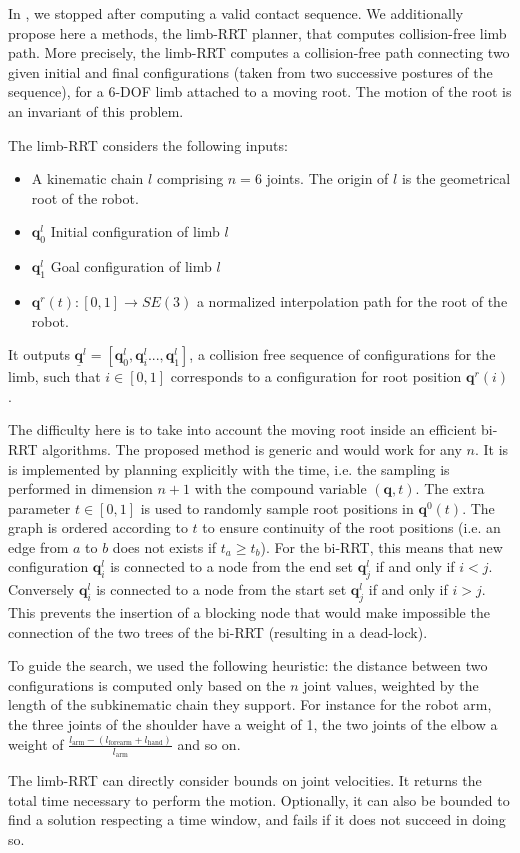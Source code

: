 In \cite{tonneau_isrr15}, we stopped after computing a valid contact sequence. We additionally propose here a methods, the limb-RRT planner, that computes collision-free limb path. More precisely, the limb-RRT computes a collision-free path connecting two given initial and final configurations (taken from two successive postures of the sequence), for a 6-DOF limb attached to a moving root. The motion of the root is an invariant of this problem.

The limb-RRT considers the following inputs:
\begin{itemize}
\item A kinematic chain $l$ comprising $n=6$ joints. The origin of $l$ is the geometrical root of the robot.
\item $\bm{q}^l_{0}$ Initial configuration of limb $l$
\item $\bm{q}^l_{1}$ Goal configuration of limb $l$
\item $\bm{q}^r(t) : [0,1] \longrightarrow SE(3)$ a normalized interpolation path for the root of the robot.
\end{itemize}

It outputs $\bm{\underline{q}}^l = [\bm{q}^l_{0}, \bm{q}^l_{i}..., \bm{q}^l_{1}]$, a collision free sequence of configurations for the limb, such
that $i \in [0,1]$ corresponds to a configuration for root position $\bm{q}^r(i)$.

The difficulty here is to take into account the moving root inside an efficient bi-RRT algorithms. The proposed method is generic and would work for any $n$. It is is implemented by planning explicitly with the time, i.e. the sampling is performed in dimension $n + 1$ with the compound variable $(\bm q,t)$. The extra parameter $t \in [0,1]$ is used to randomly sample root positions in $\bm{q}^0(t)$.
The graph is ordered according to $t$ to ensure continuity of the root positions (i.e. an edge from $a$ to $b$ does not exists if $t_a \ge t_b$).  
For the bi-RRT, this means that new configuration $\bm{q}^l_{i}$ is connected to a node from the end set $\bm{q}^l_{j}$  if and only if $i < j$.
Conversely  $\bm{q}^l_{i}$ is connected to a node from the start set $\bm{q}^l_{j}$  if and only if $i > j$. This prevents the insertion of a blocking node that would make impossible the connection of the two trees of the bi-RRT (resulting in a dead-lock).

To guide the search, we used the following heuristic: the distance between two configurations is computed only based on the $n$ joint values, weighted by the length of the subkinematic chain they support. For instance for the robot arm, the three joints of the shoulder have a weight of 1, the two joints of the elbow a weight of $\frac{l_{\text{arm}} - (l_{\text{forearm}} + l_{\text{hand}}) } {l_{\text{arm}}}$ and so on.

The limb-RRT can directly consider bounds on joint velocities. It returns the total time necessary to perform the motion. Optionally, it can also be bounded to find a solution respecting a time window, and fails if it does not succeed in doing so.

\renewcommand{\widthValue}{\linewidth}